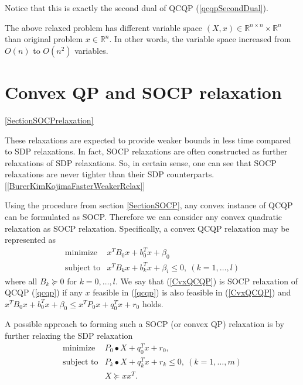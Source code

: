 \documentclass[12pt]{book}
\theoremstyle{definition}
\begin{document}
\rem Notice that this is exactly the second dual of QCQP (\ref{qcqpSecondDual}).




The above relaxed problem has different variable space $(X,x)\in \mathbb{R}^{n\times n}\times \mathbb{R}^n$ than original problem $x\in \mathbb{R}^n$. 
In other words, the variable space increased from $O(n)$ to $O(n^2)$ variables.


\section{Convex QP and SOCP relaxation}
\ref{SectionSOCPrelaxation}

These relaxations are expected to provide weaker bounds in less time compared to SDP relaxations. In fact, SOCP relaxations are often constructed as further relaxations of SDP relaxations. So, in certain sense, one can see that SOCP relaxations are never tighter than their SDP counterparts. [\ref{BurerKimKojimaFasterWeakerRelax}]

Using the procedure from section \ref{SectionSOCP}, any convex instance of QCQP can be formulated as SOCP. Therefore we can consider any convex quadratic relaxation as SOCP relaxation. 
Specifically, a convex QCQP relaxation may be represented as 
\begin{equation}
\label{CvxQCQP} 
\begin{array}{ll}
\mbox{minimize}& x^TB_0x + b_0^Tx + \beta_0\\
\mbox{subject to}& x^TB_kx + b_k^Tx + \beta_i \leq 0, \  (k = 1,\dots ,l)
\end{array} 
\end{equation}
where all $B_k\succeq 0$ for $k=0,\dots ,l$. We say that (\ref{CvxQCQP}) is SOCP relaxation of QCQP (\ref{qcqp}) if any $x$ feasible in (\ref{qcqp}) is also feasible in (\ref{CvxQCQP}) and $x^TB_0x+b_0^Tx + \beta_0 \leq x^TP_0x+q_0^Tx+r_0$ holds.

A possible approach to forming such a SOCP (or convex QP) relaxation is by further relaxing the SDP relaxation 
\begin{equation}
\label{SDPRelaxSOCPsection}
\begin{array}{ll}
\mbox{minimize}& P_0\bullet X + q_0^Tx + r_0,\\
\mbox{subject to}& P_k\bullet X+ q_k^Tx + r_k \leq 0, \  (k = 1,\dots ,m)\\
& X\succeq xx^T.
\end{array} 
\end{equation}
\end{document}
